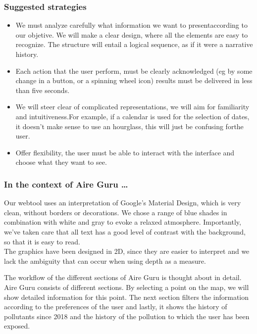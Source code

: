 \subsubsection*{Suggested strategies} 

\begin{itemize}
    \item We must analyze carefully what information we want to presentaccording to our objetive. We will make a clear design, where all the elements are easy to recognize.
    The structure will entail a logical sequence, as if it were a narrative history.\\
    \item Each action that the user perform, must be clearly acknowledged (eg by some change in a button, or a spinning wheel icon) results must be delivered in less than five seconds.
    \item We will steer clear of complicated representations, we will aim for familiarity and intuitiveness.For example, if a calendar is used for the selection of dates, it doesn't 
    make sense to use an hourglass, this will just be confusing forthe user.\\
    \item Offer flexibility, the user must be able to interact with the interface and choose what they want to see.
\end{itemize}

\subsubsection*{In the context of Aire Guru \ldots}

Our webtool uses an interpretation of Google's Material Design, which is very clean, without borders or decorations.
We chose a range of blue shades in combination with white and gray to evoke a relaxed atmosphere.
Importantly, we've taken care that all text has a good level of contrast with the background, so that it is easy to read.\\

The graphics have been designed in 2D, since they are easier to interpret and we lack the ambiguity that can occur when using depth as a measure.

The workflow of the different sections of Aire Guru is thought about in detail.
Aire Guru consists of different sections. By selecting a point on the map, we
will show detailed information for this point. The next section filters the information according to the preferences of the user
and lastly, it shows the history of pollutants since 2018 and the history of the pollution to which the user has been
exposed.\\

